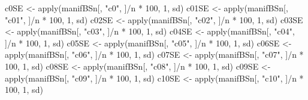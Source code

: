 \documentclass[
]{book}
\newenvironment{Shaded}{\begin{snugshade}}{\end{snugshade}}
\newcommand{\DecValTok}[1]{\textcolor[rgb]{0.00,0.00,0.81}{#1}}
\newcommand{\FunctionTok}[1]{\textcolor[rgb]{0.00,0.00,0.00}{#1}}
\newcommand{\NormalTok}[1]{#1}
\newcommand{\OtherTok}[1]{\textcolor[rgb]{0.56,0.35,0.01}{#1}}
\newcommand{\SpecialCharTok}[1]{\textcolor[rgb]{0.00,0.00,0.00}{#1}}
\newcommand{\StringTok}[1]{\textcolor[rgb]{0.31,0.60,0.02}{#1}}
\begin{document}
\begin{Shaded}
\begin{Highlighting}[]
\NormalTok{c0SE }\OtherTok{\textless{}{-}} \FunctionTok{apply}\NormalTok{(manifBSn[, }\StringTok{"c0"}\NormalTok{, ]}\SpecialCharTok{/}\NormalTok{n }\SpecialCharTok{*} \DecValTok{100}\NormalTok{, }\DecValTok{1}\NormalTok{, sd)}
\NormalTok{c01SE }\OtherTok{\textless{}{-}} \FunctionTok{apply}\NormalTok{(manifBSn[, }\StringTok{"c01"}\NormalTok{, ]}\SpecialCharTok{/}\NormalTok{n }\SpecialCharTok{*} \DecValTok{100}\NormalTok{, }\DecValTok{1}\NormalTok{, sd)}
\NormalTok{c02SE }\OtherTok{\textless{}{-}} \FunctionTok{apply}\NormalTok{(manifBSn[, }\StringTok{"c02"}\NormalTok{, ]}\SpecialCharTok{/}\NormalTok{n }\SpecialCharTok{*} \DecValTok{100}\NormalTok{, }\DecValTok{1}\NormalTok{, sd)}
\NormalTok{c03SE }\OtherTok{\textless{}{-}} \FunctionTok{apply}\NormalTok{(manifBSn[, }\StringTok{"c03"}\NormalTok{, ]}\SpecialCharTok{/}\NormalTok{n }\SpecialCharTok{*} \DecValTok{100}\NormalTok{, }\DecValTok{1}\NormalTok{, sd)}
\NormalTok{c04SE }\OtherTok{\textless{}{-}} \FunctionTok{apply}\NormalTok{(manifBSn[, }\StringTok{"c04"}\NormalTok{, ]}\SpecialCharTok{/}\NormalTok{n }\SpecialCharTok{*} \DecValTok{100}\NormalTok{, }\DecValTok{1}\NormalTok{, sd)}
\NormalTok{c05SE }\OtherTok{\textless{}{-}} \FunctionTok{apply}\NormalTok{(manifBSn[, }\StringTok{"c05"}\NormalTok{, ]}\SpecialCharTok{/}\NormalTok{n }\SpecialCharTok{*} \DecValTok{100}\NormalTok{, }\DecValTok{1}\NormalTok{, sd)}
\NormalTok{c06SE }\OtherTok{\textless{}{-}} \FunctionTok{apply}\NormalTok{(manifBSn[, }\StringTok{"c06"}\NormalTok{, ]}\SpecialCharTok{/}\NormalTok{n }\SpecialCharTok{*} \DecValTok{100}\NormalTok{, }\DecValTok{1}\NormalTok{, sd)}
\NormalTok{c07SE }\OtherTok{\textless{}{-}} \FunctionTok{apply}\NormalTok{(manifBSn[, }\StringTok{"c07"}\NormalTok{, ]}\SpecialCharTok{/}\NormalTok{n }\SpecialCharTok{*} \DecValTok{100}\NormalTok{, }\DecValTok{1}\NormalTok{, sd)}
\NormalTok{c08SE }\OtherTok{\textless{}{-}} \FunctionTok{apply}\NormalTok{(manifBSn[, }\StringTok{"c08"}\NormalTok{, ]}\SpecialCharTok{/}\NormalTok{n }\SpecialCharTok{*} \DecValTok{100}\NormalTok{, }\DecValTok{1}\NormalTok{, sd)}
\NormalTok{c09SE }\OtherTok{\textless{}{-}} \FunctionTok{apply}\NormalTok{(manifBSn[, }\StringTok{"c09"}\NormalTok{, ]}\SpecialCharTok{/}\NormalTok{n }\SpecialCharTok{*} \DecValTok{100}\NormalTok{, }\DecValTok{1}\NormalTok{, sd)}
\NormalTok{c10SE }\OtherTok{\textless{}{-}} \FunctionTok{apply}\NormalTok{(manifBSn[, }\StringTok{"c10"}\NormalTok{, ]}\SpecialCharTok{/}\NormalTok{n }\SpecialCharTok{*} \DecValTok{100}\NormalTok{, }\DecValTok{1}\NormalTok{, sd)}

\end{Highlighting}
\end{Shaded}
\end{document}
